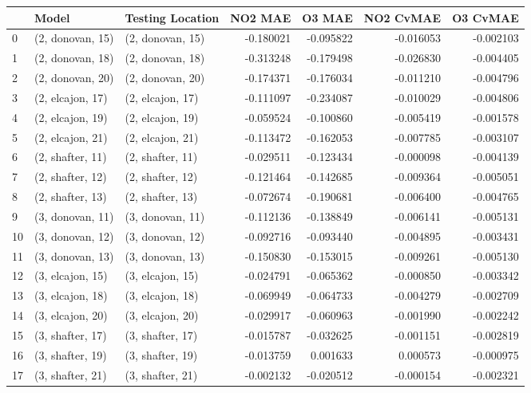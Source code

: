 \begin{tabular}{lllrrrr}
\toprule
{} &             Model &  Testing Location &   NO2 MAE &    O3 MAE &  NO2 CvMAE &  O3 CvMAE \\
\midrule
0  &  (2, donovan, 15) &  (2, donovan, 15) & -0.180021 & -0.095822 &  -0.016053 & -0.002103 \\
1  &  (2, donovan, 18) &  (2, donovan, 18) & -0.313248 & -0.179498 &  -0.026830 & -0.004405 \\
2  &  (2, donovan, 20) &  (2, donovan, 20) & -0.174371 & -0.176034 &  -0.011210 & -0.004796 \\
3  &  (2, elcajon, 17) &  (2, elcajon, 17) & -0.111097 & -0.234087 &  -0.010029 & -0.004806 \\
4  &  (2, elcajon, 19) &  (2, elcajon, 19) & -0.059524 & -0.100860 &  -0.005419 & -0.001578 \\
5  &  (2, elcajon, 21) &  (2, elcajon, 21) & -0.113472 & -0.162053 &  -0.007785 & -0.003107 \\
6  &  (2, shafter, 11) &  (2, shafter, 11) & -0.029511 & -0.123434 &  -0.000098 & -0.004139 \\
7  &  (2, shafter, 12) &  (2, shafter, 12) & -0.121464 & -0.142685 &  -0.009364 & -0.005051 \\
8  &  (2, shafter, 13) &  (2, shafter, 13) & -0.072674 & -0.190681 &  -0.006400 & -0.004765 \\
9  &  (3, donovan, 11) &  (3, donovan, 11) & -0.112136 & -0.138849 &  -0.006141 & -0.005131 \\
10 &  (3, donovan, 12) &  (3, donovan, 12) & -0.092716 & -0.093440 &  -0.004895 & -0.003431 \\
11 &  (3, donovan, 13) &  (3, donovan, 13) & -0.150830 & -0.153015 &  -0.009261 & -0.005130 \\
12 &  (3, elcajon, 15) &  (3, elcajon, 15) & -0.024791 & -0.065362 &  -0.000850 & -0.003342 \\
13 &  (3, elcajon, 18) &  (3, elcajon, 18) & -0.069949 & -0.064733 &  -0.004279 & -0.002709 \\
14 &  (3, elcajon, 20) &  (3, elcajon, 20) & -0.029917 & -0.060963 &  -0.001990 & -0.002242 \\
15 &  (3, shafter, 17) &  (3, shafter, 17) & -0.015787 & -0.032625 &  -0.001151 & -0.002819 \\
16 &  (3, shafter, 19) &  (3, shafter, 19) & -0.013759 &  0.001633 &   0.000573 & -0.000975 \\
17 &  (3, shafter, 21) &  (3, shafter, 21) & -0.002132 & -0.020512 &  -0.000154 & -0.002321 \\

\end{tabular}
